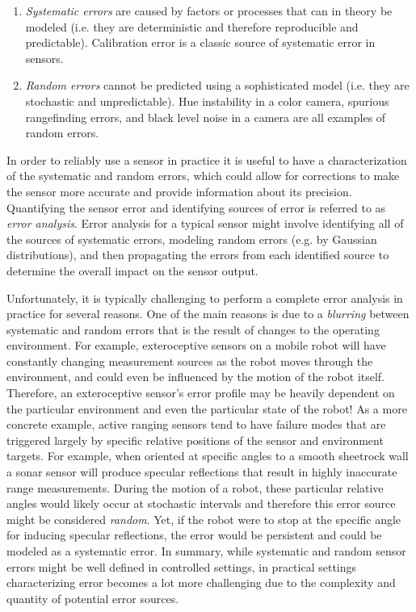 \begin{enumerate}
    \item \textit{Systematic errors} are caused by factors or processes that can in theory be modeled (i.e. they are deterministic and therefore reproducible and predictable). Calibration error is a classic source of systematic error in sensors.
    \item \textit{Random errors} cannot be predicted using a sophisticated model (i.e. they are stochastic and unpredictable). Hue instability in a color camera, spurious rangefinding errors, and black level noise in a camera are all examples of random errors.
\end{enumerate}

In order to reliably use a sensor in practice it is useful to have a characterization of the systematic and random errors, which could allow for corrections to make the sensor more accurate and provide information about its precision. Quantifying the sensor error and identifying sources of error is referred to as \textit{error analysis}. Error analysis for a typical sensor might involve identifying all of the sources of systematic errors, modeling random errors (e.g. by Gaussian distributions), and then propagating the errors from each identified source to determine the overall impact on the sensor output.

Unfortunately, it is typically challenging to perform a complete error analysis in practice for several reasons. One of the main reasons is due to a \textit{blurring} between systematic and random errors that is the result of changes to the operating environment. For example, exteroceptive sensors on a mobile robot will have constantly changing measurement sources as the robot moves through the environment, and could even be influenced by the motion of the robot itself. Therefore, an exteroceptive sensor's error profile may be heavily dependent on the particular environment and even the particular state of the robot! As a more concrete example, active ranging sensors tend to have failure modes that are triggered largely by specific relative positions of the sensor and environment targets. For example, when oriented at specific angles to a smooth sheetrock wall a sonar sensor will produce specular reflections that result in highly inaccurate range measurements. During the motion of a robot, these particular relative angles would likely occur at stochastic intervals and therefore this error source might be considered \textit{random}. Yet, if the robot were to stop at the specific angle for inducing specular reflections, the error would be persistent and could be modeled as a systematic error. In summary, while systematic and random sensor errors might be well defined in controlled settings, in practical settings characterizing error becomes a lot more challenging due to the complexity and quantity of potential error sources.

